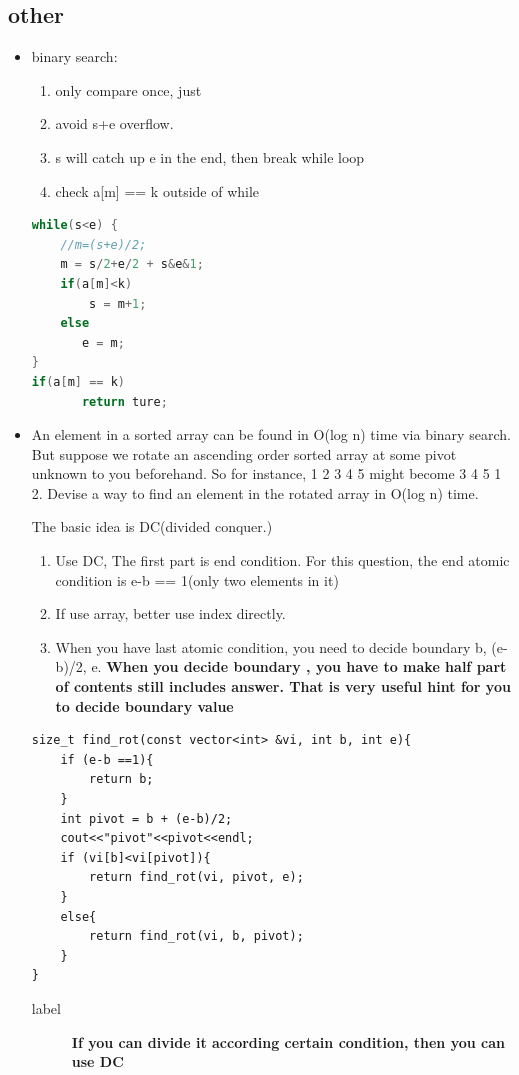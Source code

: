 \documentclass[a4paper,11pt,twoside]{book}
\begin{document}
\subsection{other }
\begin{itemize}
\item binary search:
\begin{enumerate}
\item only compare once, just  
\item avoid s+e overflow.
\item s will catch up e in the end, then break while loop 
\item check a[m] == k outside of while
\end{enumerate}

\begin{lstlisting}[frame=single, language=c++]
while(s<e) {
    //m=(s+e)/2;
    m = s/2+e/2 + s&e&1;
    if(a[m]<k)
        s = m+1;
    else 
       e = m;
}
if(a[m] == k) 
       return ture; 
\end{lstlisting}


\item An element in a sorted array can be found in O(log n) time via binary search. But suppose we rotate an ascending order sorted array at some pivot unknown to you beforehand. So for instance, 1 2 3 4 5 might become 3 4 5 1 2. Devise a way to find an element in the rotated array in O(log n) time.

The basic idea is DC(divided conquer.) 
\begin{enumerate}
	\item Use DC, The first part is end condition. For this question, the end atomic condition is e-b == 1(only two elements in it)
	\item If use array, better use index directly.
	\item When you have last atomic condition, you need to decide boundary  b, (e-b)/2, e. \textbf{When you decide boundary , you have to make half part of contents still includes answer. That is very useful hint for you to decide boundary value}
\end{enumerate}

\begin{lstlisting}[breaklines]
size_t find_rot(const vector<int> &vi, int b, int e){
	if (e-b ==1){
		return b;		
	}
	int pivot = b + (e-b)/2;
	cout<<"pivot"<<pivot<<endl;
	if (vi[b]<vi[pivot]){ 
		return find_rot(vi, pivot, e);
	}
	else{
		return find_rot(vi, b, pivot);
	}
}	
\end{lstlisting}
\begin{description}
	\item[label] \textbf{If you can divide it according certain condition, then you can use DC}
\end{description}

\end{itemize} 
\end{document}

